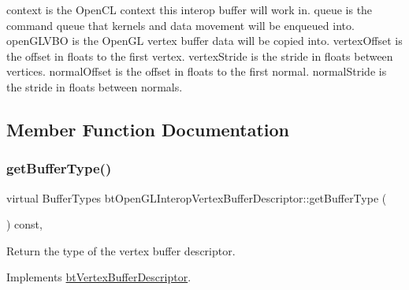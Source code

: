 context is the Open\+CL context this interop buffer will work in. queue is the command queue that kernels and data movement will be enqueued into. open\+G\+L\+V\+BO is the Open\+GL vertex buffer data will be copied into. vertex\+Offset is the offset in floats to the first vertex. vertex\+Stride is the stride in floats between vertices. normal\+Offset is the offset in floats to the first normal. normal\+Stride is the stride in floats between normals. 

\subsection{Member Function Documentation}
\mbox{\label{classbtOpenGLInteropVertexBufferDescriptor_ad53252ccc0b8f46e1b0af4d8ba1cd445}} 
\subsubsection{\texorpdfstring{get\+Buffer\+Type()}{getBufferType()}\hspace{0.1cm}{\footnotesize\ttfamily [1/2]}}
{\footnotesize\ttfamily virtual Buffer\+Types bt\+Open\+G\+L\+Interop\+Vertex\+Buffer\+Descriptor\+::get\+Buffer\+Type (\begin{DoxyParamCaption}{ }\end{DoxyParamCaption}) const\hspace{0.3cm}{\ttfamily [inline]}, {\ttfamily [virtual]}}

Return the type of the vertex buffer descriptor. 

Implements \hyperlink{classbtVertexBufferDescriptor_a1744d7c3b3452f130a215927d63ab130}{bt\+Vertex\+Buffer\+Descriptor}.

\mbox{\label{classbtOpenGLInteropVertexBufferDescriptor_ad53252ccc0b8f46e1b0af4d8ba1cd445}} 
